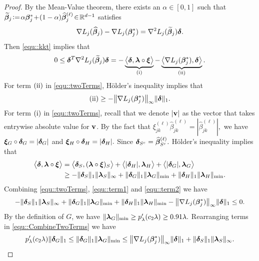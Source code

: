 \documentclass[twoside,11pt]{article}
\newcommand{\defeq}{\vcentcolon=}
\newcommand*{\BR}{\mathbb{R}}
\newcommand*{\hbbeta}{\hat{\bbeta}}
\newcommand*{\tbbeta}{\tilde{\bbeta}}
\newcommand*{\gradstarss} {\nabla {L_j}(\bbeta^*_{j})}
\newcommand*{\hgradss} {\nabla {L_j}(\hbbeta_{j})}
\newcommand*{\thessss}{\nabla^2{L_j}(\tbbeta_{j})}
\newcommand*{\hbbetas}{\hat{\bbeta}_{j}}
\newcommand*{\bbetass}{\bbeta^*_{j}}
\newcommand{\rmnum}[1]{\romannumeral #1}
\newcommand*{\la}{\langle}
\newcommand*{\ra}{\rangle}
\begin{document}
\begin{proof}
By  the Mean-Value theorem, there exists an $\alpha\!\in\![0,1]$ such that $\tbbeta_j\! \defeq\! \alpha \bbetass\! +\! (1 - \alpha)\hbbetas^{(\ell)} \!\in\! \BR^{d-1}$ satisfies
 $$
 \hgradss - \gradstarss  = \thessss  \bdelta.
$$
Then \eqref{equ::kkt} implies that 
\begin{align} \label{equ::twoTerms}
0 \leq  \bdelta^T \thessss\bdelta = - \underbrace{\bigl\la \bdelta, \blambda \circ\bxi\bigr\ra}_{(\text{\rmnum{1}})} - \underbrace{\bigl\la\gradstarss, \bdelta\bigr\ra }_{(\text{\rmnum{2}})}.
\end{align}
For term $(\text{\rmnum{2}})$ in \eqref{equ::twoTerms},  H\"{o}lder's inequality implies that  
\begin{align}\label{equ::term1}
 (\text{\rmnum{2}}) \geq - \big\|\gradstarss\big\|_{\infty} \|\bdelta\|_1 .
 \end{align}
For term $(\text{\rmnum{1}})$ in \eqref{equ::twoTerms}, recall that we denote $| \mathbf{v} |$ as the vector that takes entrywise absolute value for $\mathbf{v}$. By the fact that $\xi_{jk}^{(\ell)} \hat{\beta}^{(\ell)}_{jk} = | \hat{\beta}^{(\ell)}_{jk}|,$ we have $\bm{\xi}_{G} \circ \bm{\delta}_{G} = |\bm{\delta}_{G}|$ and $\bm{\xi}_{H} \circ \bm{\delta}_{H} = |\bm{\delta}_{H}|.$ Since $\bdelta_{S^c} = \hbbeta_{S^c}^{(\ell)}.$ 
H\"{o}lder's inequality implies that 
\begin{align}
\bigl\la\bdelta, \blambda\circ\bxi\bigr\ra &=\bigl\la \bdelta_S, (\blambda \circ \bxi)_S\bigr\ra + \bigl\la |\bdelta_H|, \blambda_H\bigr\ra + \bigl\la |\bdelta_G|, \blambda_G\bigr\ra \notag\\
& \geq - \|\bdelta_S \|_1 \|\blambda_S\|_\infty + \|\bdelta_G\|_1  \|\blambda_G\|_{\min} + \|\bdelta_H\|_1 \|\blambda_H\|_{\min}.\label{equ::term2}
\end{align}
Combining \eqref{equ::twoTerms}, \eqref{equ::term1} and \eqref{equ::term2}  we have 
\begin{align}\label{equ::CombineTwoTerms}
 - \|\bdelta_S \|_1 \|\blambda_S\|_\infty + \|\bdelta_G\|_1  \|\blambda_G\|_{\min} + \|\bdelta_H\|_1 \|\blambda_H\|_{\min} -  \big\|\gradstarss\big\|_{\infty} \|\bdelta\|_1 \leq 0.
\end{align}
By the definition of $G$, we have $\| \bm{\lambda}_G \|_{\min}\geq  p_{\lambda}'(c_2\lambda)\geq 0.91 \lambda.$ 
Rearranging terms in \eqref{equ::CombineTwoTerms} we have
\begin{align*}
p_{\lambda}'(c_2\lambda)\|\bdelta_G\|_1  \leq  \|\bdelta_G\|_1 \|\blambda_G\|_{\min} \leq \big\|\gradstarss\big\|_{\infty} \|\bdelta\|_1 +  \|\bdelta_S \|_1 \|\blambda_S\|_\infty.
\end{align*}


\end{proof}
\end{document}
